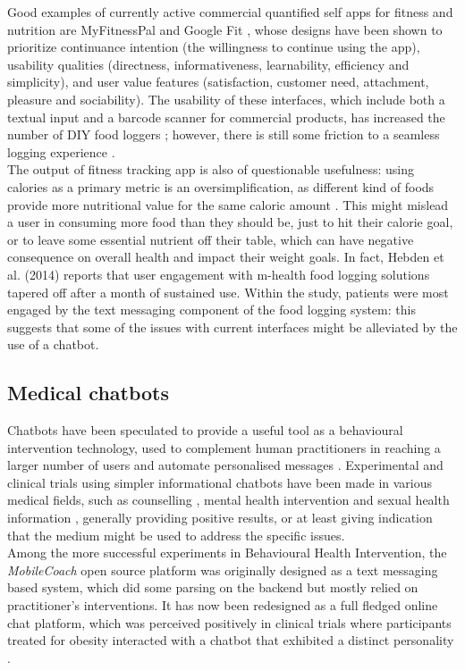 Good examples of currently active commercial quantified self apps for fitness and nutrition are MyFitnessPal \cite{mfpwebsite} and Google Fit \cite{googlefitwebsite}, whose designs have been shown \cite{Suzianti2017} to prioritize continuance intention (the willingness to continue using the app), usability qualities (directness, informativeness, learnability, efficiency and simplicity), and user value features (satisfaction, customer need, attachment, pleasure and sociability). The usability of these interfaces, which include both a textual input and a barcode scanner for commercial products, has increased the number of DIY food loggers \cite{Alonso2015}; however, there is still some friction to a seamless logging experience \cite{Boushey2016}. \\
The output of fitness tracking app is also of questionable usefulness: using calories as a primary metric is an oversimplification, as different kind of foods provide more nutritional value for the same caloric amount \cite{webmdcalories}. This might mislead a user in consuming more food than they should be, just to hit their calorie goal, or to leave some essential nutrient off their table, which can have negative consequence on overall health and impact their weight goals. In fact, Hebden et al. (2014)\cite{hebden2014} reports that user engagement with m-health food logging solutions tapered off after a month of sustained use. Within the study, patients were most engaged by the text messaging component of the food logging system: this suggests that some of the issues with current interfaces might be alleviated by the use of a chatbot. 
\subsection{Medical chatbots} 
Chatbots have been speculated to provide a useful tool as a behavioural intervention technology, used to complement human practitioners in reaching a larger number of users and automate personalised messages \cite{Gabrielli2017}. Experimental and clinical trials using simpler informational chatbots have been made in various medical fields, such as counselling \cite{Cameron}, mental health intervention \cite{Elmasri2012} and sexual health information \cite{Brixey2017}, generally providing positive results, or at least giving indication that the medium might be used to address the specific issues. \\
Among the more successful experiments in Behavioural Health Intervention, the \textit{MobileCoach} open source platform \cite{mobilecoacheu} was originally designed as a text messaging based system, which did some parsing on the backend but mostly relied on practitioner's interventions. It has now been redesigned as a full fledged online chat platform, which was perceived positively in clinical trials where participants treated for obesity interacted with a chatbot that exhibited a distinct personality \cite{Kowatsch2017}.


